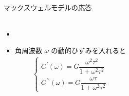 \documentclass[unicode,12pt]{beamer}%
\begin{document}
\begin{frame}
\begin{columns}[c, onlytextwidth]
\begin{block}{マックスウェルモデルの応答}
\begin{itemize}
\begin{align*}
						\end{align*}
						\item \vspace{-3mm}
						\item 角周波数 $\omega$ の動的ひずみを入れると
						\vspace{-3mm}
						\begin{align*}
							\begin{cases}
								G^{\prime}(\omega) = G\dfrac{\omega^2 \tau^2}{1+\omega^2\tau^2} \\[12pt]
								G^{\prime \prime}(\omega) = G\dfrac{\omega \tau}{1+\omega^2\tau^2}
							\end{cases}
						\end{align*}
					\end{itemize}		
				\end{block}
		\end{columns}
\end{frame}
\end{document}
